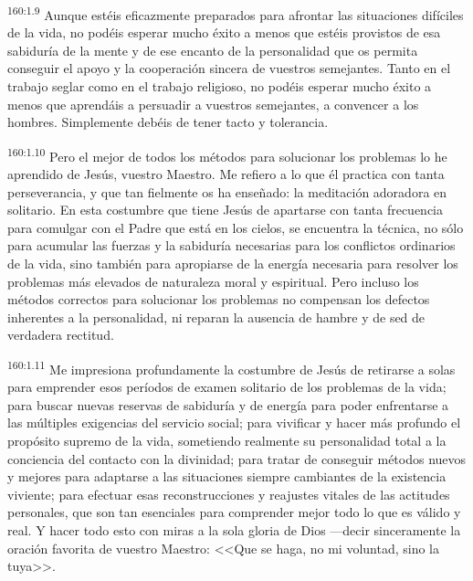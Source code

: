 \par 
\textsuperscript{160:1.9} Aunque estéis eficazmente preparados para afrontar las situaciones difíciles de la vida, no podéis esperar mucho éxito a menos que estéis provistos de esa sabiduría de la mente y de ese encanto de la personalidad que os permita conseguir el apoyo y la cooperación sincera de vuestros semejantes. Tanto en el trabajo seglar como en el trabajo religioso, no podéis esperar mucho éxito a menos que aprendáis a persuadir a vuestros semejantes, a convencer a los hombres. Simplemente debéis de tener tacto y tolerancia.

\par 
\textsuperscript{160:1.10} Pero el mejor de todos los métodos para solucionar los problemas lo he aprendido de Jesús, vuestro Maestro. Me refiero a lo que él practica con tanta perseverancia, y que tan fielmente os ha enseñado: la meditación adoradora en solitario. En esta costumbre que tiene Jesús de apartarse con tanta frecuencia para comulgar con el Padre que está en los cielos, se encuentra la técnica, no sólo para acumular las fuerzas y la sabiduría necesarias para los conflictos ordinarios de la vida, sino también para apropiarse de la energía necesaria para resolver los problemas más elevados de naturaleza moral y espiritual. Pero incluso los métodos correctos para solucionar los problemas no compensan los defectos inherentes a la personalidad, ni reparan la ausencia de hambre y de sed de verdadera rectitud.

\par 
\textsuperscript{160:1.11} Me impresiona profundamente la costumbre de Jesús de retirarse a solas para emprender esos períodos de examen solitario de los problemas de la vida; para buscar nuevas reservas de sabiduría y de energía para poder enfrentarse a las múltiples exigencias del servicio social; para vivificar y hacer más profundo el propósito supremo de la vida, sometiendo realmente su personalidad total a la conciencia del contacto con la divinidad; para tratar de conseguir métodos nuevos y mejores para adaptarse a las situaciones siempre cambiantes de la existencia viviente; para efectuar esas reconstrucciones y reajustes vitales de las actitudes personales, que son tan esenciales para comprender mejor todo lo que es válido y real. Y hacer todo esto con miras a la sola gloria de Dios ---decir sinceramente la oración favorita de vuestro Maestro: <<Que se haga, no mi voluntad, sino la tuya>>.

